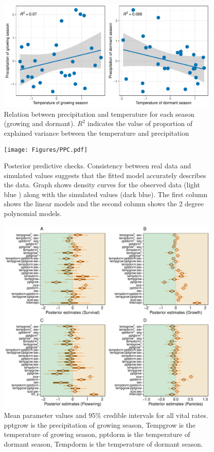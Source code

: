 \documentclass[12pt]{article}\usepackage[]{graphicx}\usepackage[dvipsnames]{xcolor}
\begin{document}
\begin{figure}[H]
		\centering
		\includegraphics[width=0.95\linewidth]{Figures/Varianceexplained.pdf}
		\caption{Relation between precipitation and temperature for each season (growing and dormant). $R^2$ indicates the value of proportion of explained variance between the temperature and precipitation}
		\label{Sup:Correlation}
\end{figure}
	
\begin{figure}[H]
		\centering
		\texttt{[image: Figures/PPC.pdf]}
		\caption{Posterior predictive checks. Consistency between real data and simulated values suggests that the fitted model accurately describes the data. Graph shows density curves for the observed data (light blue ) along with the simulated values (dark blue). The first column shows the linear models and the second column shows the 2 degree polynomial models.}
		\label{Sup:PPC}
	\end{figure}
	
\begin{figure}[H]
		\centering
		\includegraphics[width=0.95\linewidth]{Figures/Posterior_mean.pdf}
		\caption{Mean parameter values and 95\% credible intervals for all vital rates. 
		pptgrow is  the precipitation of growing season,
		Tempgrow is the temperature of growing season,
		pptdorm is the temperature of dormant season,
		Tempdorm is the temperature of dormant season.}
		\label{Sup:Posterior}
\end{figure}
\end{document}
